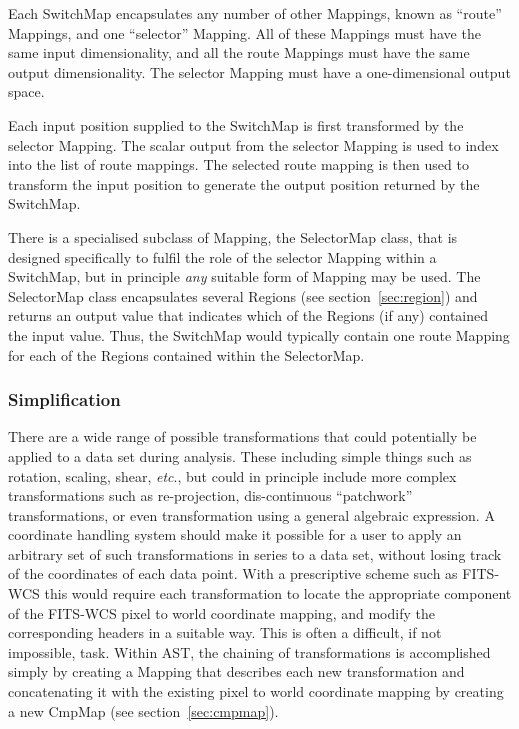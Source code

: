 \documentclass[final,authoryear,5p,times,twocolumn]{elsarticle}
\begin{document}
Each SwitchMap encapsulates any number of other Mappings, known as ``route''
Mappings, and one ``selector'' Mapping. All of these Mappings must have the
same input dimensionality, and all the route Mappings must have the same
output dimensionality. The selector Mapping must have a one-dimensional
output space.

Each input position supplied to the SwitchMap is first transformed by the
selector Mapping. The scalar output from the selector Mapping is used to
index into the list of route mappings. The selected route mapping is then
used to transform the input position to generate the output position
returned by the SwitchMap.

There is a specialised subclass of Mapping, the SelectorMap class, that
is designed specifically to fulfil the role of the selector Mapping
within a SwitchMap, but in principle \emph{any} suitable form of Mapping
may be used. The SelectorMap class encapsulates several Regions (see
section~\ref{sec:region}) and returns an output value that indicates
which of the  Regions (if any) contained the input value. Thus, the
SwitchMap would typically contain one route Mapping for each of the
Regions contained within the SelectorMap.

\subsubsection{Simplification}
\label{sec:simplification}

There are a wide range of possible transformations that could
potentially be applied to a data set during analysis. These
including simple things such as rotation, scaling, shear, \emph{etc}., but
could in principle include more complex transformations such as
re-projection, dis-continuous ``patchwork'' transformations, or even
transformation using a general algebraic expression.  A coordinate
handling system should make it possible for a user to apply an
arbitrary set of such transformations in series to a data set, without
losing track of the coordinates of each data point. With a
prescriptive scheme such as FITS-WCS this would require each
transformation to locate the appropriate component of the FITS-WCS
pixel to world coordinate mapping, and modify the corresponding
headers in a suitable way. This is often a difficult, if not
impossible, task. Within AST, the chaining of transformations is
accomplished simply by creating a Mapping that describes each new
transformation and concatenating it with the existing pixel to world
coordinate mapping by creating a new CmpMap (see section~\ref{sec:cmpmap}).
\end{document}
